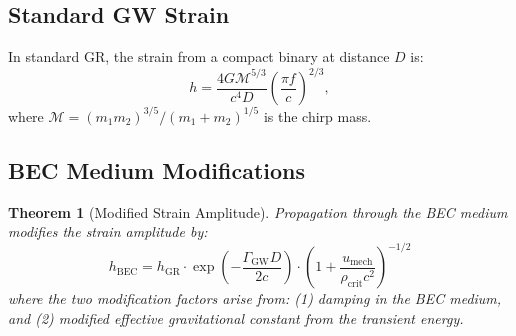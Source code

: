 \documentclass[11pt,a4paper]{article}
\newcommand{\rhocrit}{\ensuremath{\rho_{\mathrm{crit}}}}
\newcommand{\umech}{\ensuremath{u_{\mathrm{mech}}}}
\newtheorem{theorem}{Theorem}[section]
\theoremstyle{definition}
\theoremstyle{remark}
\begin{document}
\subsection{Standard GW Strain}
\label{sec:standard_strain}

In standard GR, the strain from a compact binary at distance $D$ is:
\begin{equation}
\label{eq:standard_strain}
h = \frac{4G\mathcal{M}^{5/3}}{c^4 D}\left(\frac{\pi f}{c}\right)^{2/3},
\end{equation}
where $\mathcal{M} = (m_1 m_2)^{3/5}/(m_1 + m_2)^{1/5}$ is the chirp mass.

\subsection{BEC Medium Modifications}
\label{sec:bec_modifications}

\begin{theorem}[Modified Strain Amplitude]
\label{thm:modified_strain}
Propagation through the BEC medium modifies the strain amplitude by:
\begin{equation}
\label{eq:modified_strain}
\boxed{h_{\mathrm{BEC}} = h_{\mathrm{GR}} \cdot \exp\left(-\frac{\Gamma_{\mathrm{GW}} D}{2c}\right) \cdot \left(1 + \frac{\umech}{\rhocrit c^2}\right)^{-1/2}}
\end{equation}
where the two modification factors arise from: (1) damping in the BEC medium, and (2) modified effective gravitational constant from the transient energy.
\end{theorem}
\end{document}
